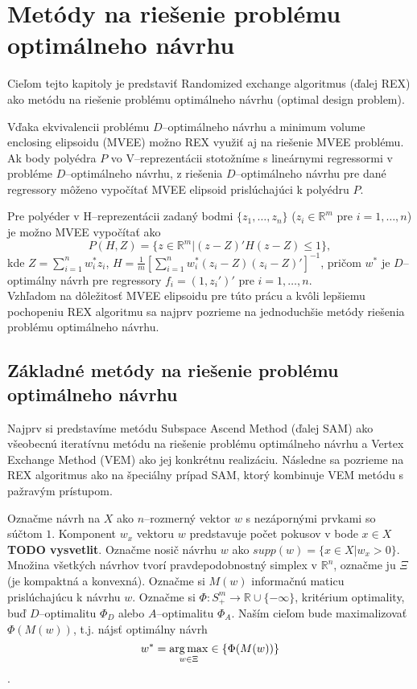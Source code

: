 \chapter{Metódy na riešenie problému optimálneho návrhu}

Cieľom tejto kapitoly je predstaviť Randomized exchange algoritmus \cite{rex_harman} (ďalej REX) ako metódu na riešenie problému optimálneho návrhu (optimal design problem).

Vďaka ekvivalencii problému $D$--optimálneho návrhu a minimum volume enclosing elipsoidu (MVEE) \cite{rex_harman} možno REX využiť aj na riešenie MVEE problému. Ak body polyédra $P$ vo V--reprezentácii stotožníme s lineárnymi regressormi v probléme $D$--optimálneho návrhu, z riešenia $D$--optimálneho návrhu pre dané regressory môženo vypočítať MVEE elipsoid prislúchajúci k polyédru $P$.

Pre polyéder v H--reprezentácii zadaný bodmi $\{ z_1, \dots, z_n \}$ ($z_i \in \mathbb{R}^m$ pre $i=1,\dots, n$) je možno MVEE vypočítať ako $$P(H, Z)= \{ z \in \mathbb{R}^m | (z-Z)'H(z-Z) \le 1 \}, $$ kde $Z=\sum_{i=1}^n w_i^*z_i$, $H=\frac{1}{m} \left[ \sum_{i=1}^n w_i^*(z_i-Z)(z_i-Z)' \right]^{-1} $, pričom $w^*$ je $D$--optimálny návrh pre regressory $f_i=(1,z_i')'$ pre $i=1,\dots, n$.\\

Vzhľadom na dôležitosť MVEE elipsoidu pre túto prácu a kvôli lepšiemu pochopeniu REX algoritmu sa najprv pozrieme na jednoduchšie metódy riešenia problému optimálneho návrhu.

\section{Základné metódy na riešenie problému optimálneho návrhu}

Najprv si predstavíme metódu Subspace Ascend Method (ďalej SAM) ako všeobecnú iteratívnu metódu na riešenie problému optimálneho návrhu a Vertex Exchange Method (VEM) ako jej konkrétnu realizáciu. Následne sa pozrieme na REX algoritmus ako na špeciálny prípad SAM, ktorý kombinuje VEM metódu s pažravým prístupom.

Označme návrh na $X$ ako $n$--rozmerný vektor $w$ s nezápornými prvkami so súčtom $1$. Komponent $w_x$ vektoru $w$ predstavuje počet pokusov v bode $x \in X$ \textbf{TODO vysvetlit}. Označme nosič návrhu $w$ ako $supp(w)=\{x \in X| w_x>0\}$. Množina všetkých návrhov tvorí pravdepodobnostný simplex v $\mathbb{R}^n$, označme ju $\Xi$ (je kompaktná a konvexná). Označme si $M(w)$ informačnú maticu prislúchajúcu k návrhu $w$. Označme si $\Phi: S^m_+ \rightarrow \mathbb{R} \cup \{-\infty\}$, kritérium optimality, buď $D$--optimalitu $\Phi_D$ alebo $A$--optimalitu $\Phi_A$. Naším cieľom bude maximalizovať $\Phi(M(w))$, t.j. nájsť optimálny návrh $$w^* = \operatorname*{arg\,max}_{w \in \Xi} \in \{\Phi(M(w))\}$$.

